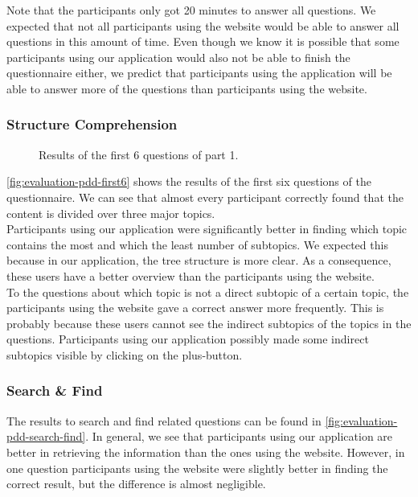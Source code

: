 Note that the participants only got 20 minutes to answer all questions. We expected that not all participants using the website would be able to answer all questions in this amount of time. Even though we know it is possible that some participants using our application would also not be able to finish the questionnaire either, we predict that participants using the application will be able to answer more of the questions than participants using the website.

\subsubsection{Structure Comprehension}\label{sec:evaluation-pdd-structure-comprehension}

\begin{figure}[H]
	\centering
	\caption{Results of the first 6 questions of part 1.}
	\label{fig:evaluation-pdd-first6}
\end{figure}

\autoref{fig:evaluation-pdd-first6} shows the results of the first six questions of the questionnaire. We can see that almost every participant correctly found that the content is divided over three major topics.\\

Participants using our application were significantly better in finding which topic contains the most and which the least number of subtopics. We expected this because in our application, the tree structure is more clear. As a consequence, these users have a better overview than the participants using the website.\\

To the questions about which topic is not a direct subtopic of a certain topic, the participants using the website gave a correct answer more frequently. This is probably because these users cannot see the indirect subtopics of the topics in the questions. Participants using our application possibly made some indirect subtopics visible by clicking on the plus-button.

\subsubsection{Search \& Find}
The results to search and find related questions can be found in \autoref{fig:evaluation-pdd-search-find}. In general, we see that participants using our application are better in retrieving the information than the ones using the website. However, in one question participants using the website were slightly better in finding the correct result, but the difference is almost negligible.

